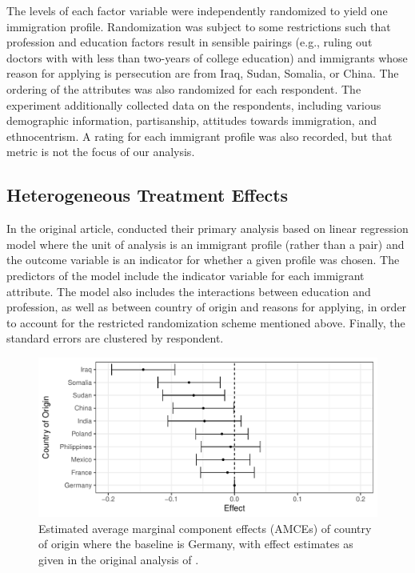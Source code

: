 The levels of each factor variable were independently randomized to
yield one immigration profile.  Randomization was subject to some
restrictions such that profession and education factors result in
sensible pairings (e.g., ruling out doctors with with less than
two-years of college education) and immigrants whose reason for
applying is persecution are from Iraq, Sudan, Somalia, or China.  The
ordering of the attributes was also randomized for each respondent.
The experiment additionally collected data on the respondents,
including various demographic information, partisanship, attitudes
towards immigration, and ethnocentrism.  A rating for each immigrant
profile was also recorded, but that metric is not the focus of our
analysis.


\subsection{Heterogeneous Treatment Effects}

In the original article, \cite{hainmueller2015hidden} conducted their
primary analysis based on linear regression model where the unit of
analysis is an immigrant profile (rather than a pair) and the outcome
variable is an indicator for whether a given profile was chosen.  The
predictors of the model include the indicator variable for each
immigrant attribute.  The model also includes the interactions between
education and profession, as well as between country of origin and
reasons for applying, in order to account for the restricted
randomization scheme mentioned above.  Finally, the standard errors
are clustered by respondent.

\begin{figure}[t]
\centering {}
\includegraphics[width=\textwidth]{figures/hh_2015_pooled.pdf}
\caption{Estimated average marginal component effects (AMCEs) of
  country of origin where the baseline is Germany, with effect estimates as given in the original analysis of
  \cite{hainmueller2015hidden}.} \label{fig:hhy_country_est}
\end{figure}

